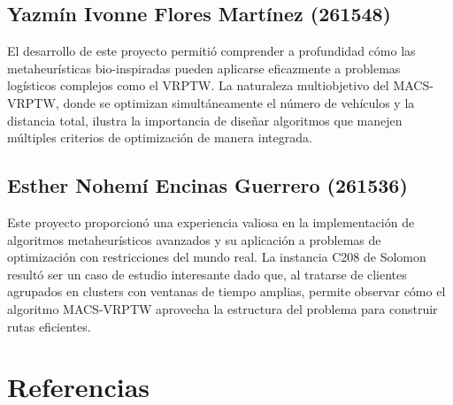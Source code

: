 \documentclass[12pt, letterpaper]{article}
\begin{document}

\subsection{Yazmín Ivonne Flores Martínez (261548)}
\label{subsec:conclusion_yazmin}


El desarrollo de este proyecto permitió comprender a profundidad cómo las metaheurísticas bio-inspiradas pueden aplicarse eficazmente a problemas logísticos complejos como el VRPTW. La naturaleza multiobjetivo del MACS-VRPTW, donde se optimizan simultáneamente el número de vehículos y la distancia total, ilustra la importancia de diseñar algoritmos que manejen múltiples criterios de optimización de manera integrada.


\subsection{Esther Nohemí Encinas Guerrero (261536)}
\label{subsec:conclusion_esther}


Este proyecto proporcionó una experiencia valiosa en la implementación de algoritmos metaheurísticos avanzados y su aplicación a problemas de optimización con restricciones del mundo real. La instancia C208 de Solomon resultó ser un caso de estudio interesante dado que, al tratarse de clientes agrupados en clusters con ventanas de tiempo amplias, permite observar cómo el algoritmo MACS-VRPTW aprovecha la estructura del problema para construir rutas eficientes.


\newpage
\section*{Referencias}
\end{document}
